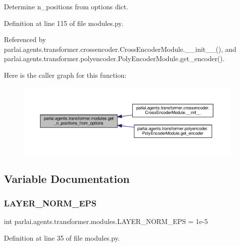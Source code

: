 \begin{DoxyVerb}Determine n_positions from options dict.\end{DoxyVerb}
 

Definition at line 115 of file modules.\+py.



Referenced by parlai.\+agents.\+transformer.\+crossencoder.\+Cross\+Encoder\+Module.\+\_\+\+\_\+init\+\_\+\+\_\+(), and parlai.\+agents.\+transformer.\+polyencoder.\+Poly\+Encoder\+Module.\+get\+\_\+encoder().

Here is the caller graph for this function\+:
\nopagebreak
\begin{figure}[H]
\begin{center}
\leavevmode
\includegraphics[width=350pt]{namespaceparlai_1_1agents_1_1transformer_1_1modules_ab67607512c597ddd54f2b60a1a1eaf4c_icgraph}
\end{center}
\end{figure}


\subsection{Variable Documentation}
\mbox{\label{namespaceparlai_1_1agents_1_1transformer_1_1modules_afb85e0862dd867aee20a92e26aa29f58}} 
\subsubsection{\texorpdfstring{L\+A\+Y\+E\+R\+\_\+\+N\+O\+R\+M\+\_\+\+E\+PS}{LAYER\_NORM\_EPS}}
{\footnotesize\ttfamily int parlai.\+agents.\+transformer.\+modules.\+L\+A\+Y\+E\+R\+\_\+\+N\+O\+R\+M\+\_\+\+E\+PS = 1e-\/5}



Definition at line 35 of file modules.\+py.

